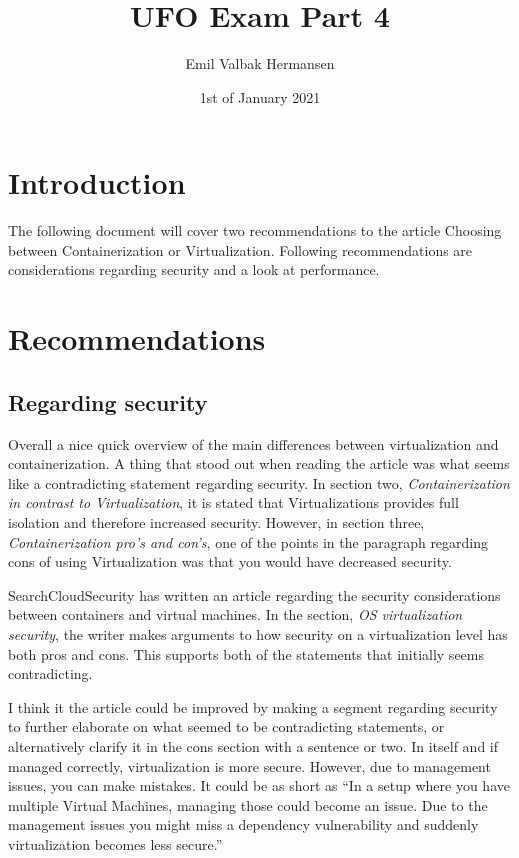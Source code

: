 \documentclass{article}
\title{UFO Exam Part 4}
\author{Emil Valbak Hermansen}
\date{1st of January 2021}
\begin{document}
\maketitle

\section{Introduction}
The following document will cover two recommendations to the article Choosing between Containerization or Virtualization\cite{contain_vs_virtual}. Following recommendations are considerations regarding security and a look at performance.
\pagebreak

\section{Recommendations}
\subsection{Regarding security}
Overall a nice quick overview of the main differences between virtualization and containerization. A thing that stood out when reading the article was what seems like a contradicting statement regarding security. In section two, \emph{Containerization in contrast to Virtualization}, it is stated that Virtualizations provides full isolation and therefore increased security. However, in section three, \emph{Containerization pro’s and con’s}, one of the points in the paragraph regarding cons of using Virtualization was that you would have decreased security. 

SearchCloudSecurity has written an article regarding the security considerations between containers and virtual machines.\cite{security_differences} In the section, \emph{OS virtualization security}, the writer makes arguments to how security on a virtualization level has both pros and cons. This supports both of the statements that initially seems contradicting. 

I think it the article could be improved by making a segment regarding security to further elaborate on what seemed to be contradicting statements, or alternatively clarify it in the cons section with a sentence or two.  In itself and if managed correctly, virtualization is more secure. However, due to management issues, you can make mistakes. It could be as short as ``In a setup where you have multiple Virtual Machines, managing those could become an issue. Due to the management issues you might miss a dependency vulnerability and suddenly virtualization becomes less secure.''
\end{document}
